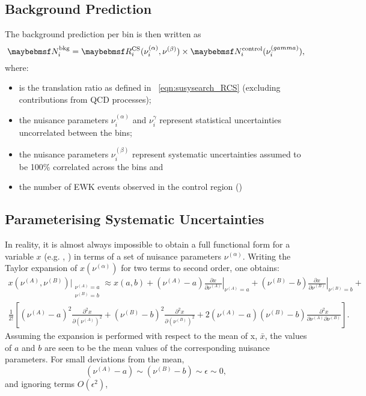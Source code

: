 \subsection{Background Prediction}
The background prediction per bin is then written as
\begin{equation*}
\NBkgi = \RCSi(\nu_i^{(\alpha)}, \nu^{(\beta)}) \times \NControli(\nu_i^{(\gamma)}),
\end{equation*}
where:
\begin{itemize}
\item \RCSi is the translation ratio as defined in \eqn~\ref{eqn:susysearch_RCS}
  (excluding contributions from \ac{QCD} processes);
\item the nuisance parameters $\nu_i^{(\alpha)}$ and $\nu_i^{\gamma}$ represent
  statistical uncertainties uncorrelated between the bins;
\item the nuisance parameters $\nu_i^{(\beta)}$ represent systematic
  uncertainties assumed to be 100\% correlated across the bins and
\item \NControli the number of \ac{EWK} events observed in the control region
  (\LPcontrol)
\end{itemize}

\subsection{Parameterising Systematic Uncertainties}
In reality, it is almost always impossible to obtain a full functional form for
a variable $x$ (e.g. \RCSi, \NControli) in terms of a set of nuisance parameters
$\nu^{(\alpha)}$. Writing the Taylor expansion of $x(\nu^{(\alpha)})$ for two terms to
second order, one obtains:
\begin{align*}
 x(\nu^{(A)}, \nu^{(B)})\bigg|_{\substack{\nu^{(A)} = a\\ \nu^{(B)} = b}} \approx
x(a,b) +
(\nu^{(A)} - a)\left.\frac{\partial x}{\partial\nu^{(A)}}\right|_{\nu^{(A)}=a} +
(\nu^{(B)} - b)\left.\frac{\partial x}{\partial\nu^{(B)}}\right|_{\nu^{(B)}=b} +\\
\frac{1}{2!}\left[
(\nu^{(A)} - a)^2 \frac{\partial^2 x}{\partial \left(\nu^{(A)}\right)^2}
+ (\nu^{(B)} - b)^2 \frac{\partial^2 x}{\partial \left(\nu^{(B)}\right)^2}
+ 2(\nu^{(A)} - a)(\nu^{(B)} - b)\frac{\partial^2 x}{\partial
  \nu^{(A)}\partial\nu^{(B)}}
\right].
\end{align*}
Assuming the expansion is performed with respect to the mean of x, $\bar{x}$,
the values of $a$ and $b$ are seen to be the mean values of the corresponding nuisance
parameters. For small deviations from the mean,
\begin{equation*}
 (\nu^{(A)} - a) \sim (\nu^{(B)} - b) \sim \epsilon \sim 0,
\end{equation*}
and ignoring terms $O(\epsilon^2)$,

